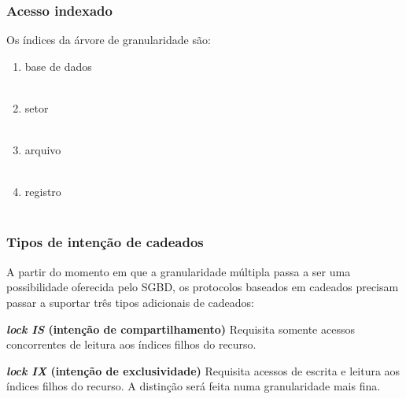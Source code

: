 \documentclass{beamer}
\begin{document}
\begin{frame}
    \frametitle{Acesso indexado}

    Os índices da árvore de granularidade são:

    \medskip
    \begin{enumerate}
        \item base de dados \\~\\
        \item setor \\~\\
        \item arquivo \\~\\
        \item registro \\~\\
    \end{enumerate}
    
\end{frame}
    
    
\begin{frame}
    \frametitle{Tipos de intenção de cadeados}
    
    A partir do momento em que a granularidade múltipla passa a ser uma possibilidade oferecida pelo SGBD, os protocolos baseados em cadeados precisam passar a suportar três tipos adicionais de cadeados:

    \medskip
    \begin{block}{\textbf{\emph{lock IS} (intenção de compartilhamento)}}
        Requisita somente acessos concorrentes de leitura aos índices filhos do recurso.
    \end{block}

    \medskip
    \begin{block}{\textbf{\emph{lock IX} (intenção de exclusividade)}}
        Requisita acessos de escrita e leitura aos índices filhos do recurso. A distinção será feita numa granularidade mais fina.
    \end{block}

\end{frame}
\end{document}

